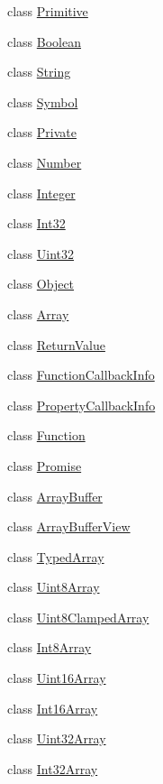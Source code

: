 \begin{DoxyCompactItemize}
\item 
class \hyperlink{classv8_1_1Primitive}{Primitive}
\item 
class \hyperlink{classv8_1_1Boolean}{Boolean}
\item 
class \hyperlink{classv8_1_1String}{String}
\item 
class \hyperlink{classv8_1_1Symbol}{Symbol}
\item 
class \hyperlink{classv8_1_1Private}{Private}
\item 
class \hyperlink{classv8_1_1Number}{Number}
\item 
class \hyperlink{classv8_1_1Integer}{Integer}
\item 
class \hyperlink{classv8_1_1Int32}{Int32}
\item 
class \hyperlink{classv8_1_1Uint32}{Uint32}
\item 
class \hyperlink{classv8_1_1Object}{Object}
\item 
class \hyperlink{classv8_1_1Array}{Array}
\item 
class \hyperlink{classv8_1_1ReturnValue}{Return\-Value}
\item 
class \hyperlink{classv8_1_1FunctionCallbackInfo}{Function\-Callback\-Info}
\item 
class \hyperlink{classv8_1_1PropertyCallbackInfo}{Property\-Callback\-Info}
\item 
class \hyperlink{classv8_1_1Function}{Function}
\item 
class \hyperlink{classv8_1_1Promise}{Promise}
\item 
class \hyperlink{classv8_1_1ArrayBuffer}{Array\-Buffer}
\item 
class \hyperlink{classv8_1_1ArrayBufferView}{Array\-Buffer\-View}
\item 
class \hyperlink{classv8_1_1TypedArray}{Typed\-Array}
\item 
class \hyperlink{classv8_1_1Uint8Array}{Uint8\-Array}
\item 
class \hyperlink{classv8_1_1Uint8ClampedArray}{Uint8\-Clamped\-Array}
\item 
class \hyperlink{classv8_1_1Int8Array}{Int8\-Array}
\item 
class \hyperlink{classv8_1_1Uint16Array}{Uint16\-Array}
\item 
class \hyperlink{classv8_1_1Int16Array}{Int16\-Array}
\item 
class \hyperlink{classv8_1_1Uint32Array}{Uint32\-Array}
\item 
class \hyperlink{classv8_1_1Int32Array}{Int32\-Array}
\item 

\end{DoxyCompactItemize}
